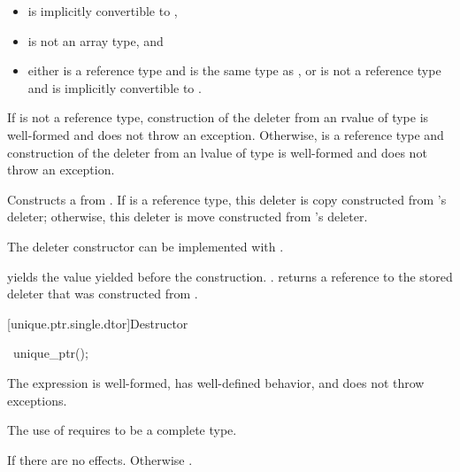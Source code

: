\begin{itemdescr}
\pnum
\constraints
\begin{itemize}
\item {} is implicitly convertible to ,
\item {} is not an array type, and
\item either  is a reference type and  is the same type as , or
 is not a reference type and  is implicitly convertible to .
\end{itemize}

\pnum
\expects
If  is not a reference type,
construction of the deleter from an rvalue of type 
is well-formed and does not throw an exception.
Otherwise,  is a reference type and
construction of the deleter from an lvalue of type 
is well-formed and does not throw an exception.

\pnum
\effects
Constructs a  from .
If  is a reference type, this deleter is copy constructed from
's deleter; otherwise, this deleter is move constructed from 's
deleter.
\begin{note}
The deleter constructor can be implemented with
.
\end{note}

\pnum
\ensures
{} yields the value 
yielded before the construction. .
 returns a reference
to the stored deleter that was constructed from
.
\end{itemdescr}

[unique.ptr.single.dtor]{Destructor}

\begin{indexed}{}
\begin{itemdecl}
~unique_ptr();
\end{itemdecl}
\end{indexed}

\begin{itemdescr}
\pnum
\expects
The expression  is well-formed,
has well-defined behavior, and does not throw exceptions.
\begin{note}
The use of  requires  to be a complete type.
\end{note}

\pnum
\effects
If  there are no effects.
Otherwise .
\end{itemdescr}

